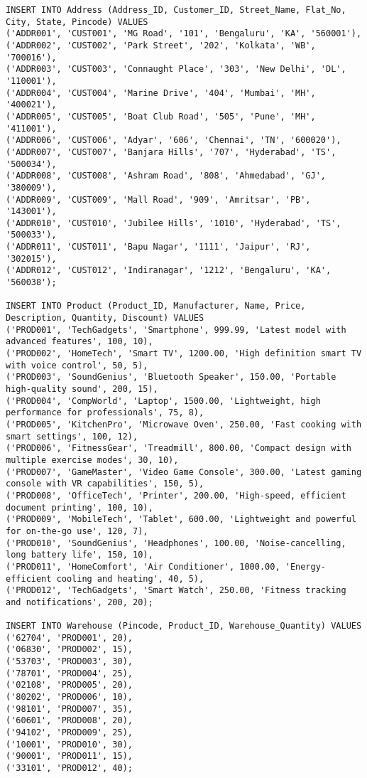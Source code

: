 \documentclass[12pt]{article}
\begin{document}
\begin{verbatim}
INSERT INTO Address (Address_ID, Customer_ID, Street_Name, Flat_No, City, State, Pincode) VALUES
('ADDR001', 'CUST001', 'MG Road', '101', 'Bengaluru', 'KA', '560001'),
('ADDR002', 'CUST002', 'Park Street', '202', 'Kolkata', 'WB', '700016'),
('ADDR003', 'CUST003', 'Connaught Place', '303', 'New Delhi', 'DL', '110001'),
('ADDR004', 'CUST004', 'Marine Drive', '404', 'Mumbai', 'MH', '400021'),
('ADDR005', 'CUST005', 'Boat Club Road', '505', 'Pune', 'MH', '411001'),
('ADDR006', 'CUST006', 'Adyar', '606', 'Chennai', 'TN', '600020'),
('ADDR007', 'CUST007', 'Banjara Hills', '707', 'Hyderabad', 'TS', '500034'),
('ADDR008', 'CUST008', 'Ashram Road', '808', 'Ahmedabad', 'GJ', '380009'),
('ADDR009', 'CUST009', 'Mall Road', '909', 'Amritsar', 'PB', '143001'),
('ADDR010', 'CUST010', 'Jubilee Hills', '1010', 'Hyderabad', 'TS', '500033'),
('ADDR011', 'CUST011', 'Bapu Nagar', '1111', 'Jaipur', 'RJ', '302015'),
('ADDR012', 'CUST012', 'Indiranagar', '1212', 'Bengaluru', 'KA', '560038');

INSERT INTO Product (Product_ID, Manufacturer, Name, Price, Description, Quantity, Discount) VALUES
('PROD001', 'TechGadgets', 'Smartphone', 999.99, 'Latest model with advanced features', 100, 10),
('PROD002', 'HomeTech', 'Smart TV', 1200.00, 'High definition smart TV with voice control', 50, 5),
('PROD003', 'SoundGenius', 'Bluetooth Speaker', 150.00, 'Portable high-quality sound', 200, 15),
('PROD004', 'CompWorld', 'Laptop', 1500.00, 'Lightweight, high performance for professionals', 75, 8),
('PROD005', 'KitchenPro', 'Microwave Oven', 250.00, 'Fast cooking with smart settings', 100, 12),
('PROD006', 'FitnessGear', 'Treadmill', 800.00, 'Compact design with multiple exercise modes', 30, 10),
('PROD007', 'GameMaster', 'Video Game Console', 300.00, 'Latest gaming console with VR capabilities', 150, 5),
('PROD008', 'OfficeTech', 'Printer', 200.00, 'High-speed, efficient document printing', 100, 10),
('PROD009', 'MobileTech', 'Tablet', 600.00, 'Lightweight and powerful for on-the-go use', 120, 7),
('PROD010', 'SoundGenius', 'Headphones', 100.00, 'Noise-cancelling, long battery life', 150, 10),
('PROD011', 'HomeComfort', 'Air Conditioner', 1000.00, 'Energy-efficient cooling and heating', 40, 5),
('PROD012', 'TechGadgets', 'Smart Watch', 250.00, 'Fitness tracking and notifications', 200, 20);

INSERT INTO Warehouse (Pincode, Product_ID, Warehouse_Quantity) VALUES
('62704', 'PROD001', 20),
('06830', 'PROD002', 15),
('53703', 'PROD003', 30),
('78701', 'PROD004', 25),
('02108', 'PROD005', 20),
('80202', 'PROD006', 10),
('98101', 'PROD007', 35),
('60601', 'PROD008', 20),
('94102', 'PROD009', 25),
('10001', 'PROD010', 30),
('90001', 'PROD011', 15),
('33101', 'PROD012', 40);


\end{verbatim}
\end{document}
